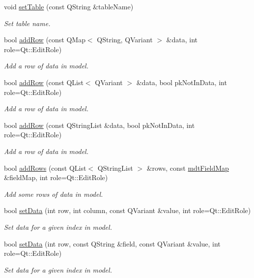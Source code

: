 \begin{DoxyCompactItemize}
\item 
void \hyperlink{classmdt_data_table_model_a75d4204a5d388756605422110d3afca1}{setTable} (const QString \&tableName)
\begin{DoxyCompactList}\small\item\em Set table name. \end{DoxyCompactList}\item 
bool \hyperlink{classmdt_data_table_model_a42046e42fdca91fe77fe48e70fed4d18}{addRow} (const QMap$<$ QString, QVariant $>$ \&data, int role=Qt::EditRole)
\begin{DoxyCompactList}\small\item\em Add a row of data in model. \end{DoxyCompactList}\item 
bool \hyperlink{classmdt_data_table_model_a9c83ac307174ed88eb2204b336d38ee2}{addRow} (const QList$<$ QVariant $>$ \&data, bool pkNotInData, int role=Qt::EditRole)
\begin{DoxyCompactList}\small\item\em Add a row of data in model. \end{DoxyCompactList}\item 
bool \hyperlink{classmdt_data_table_model_a2834bc9663aa478bac5147d2ca7e16ee}{addRow} (const QStringList \&data, bool pkNotInData, int role=Qt::EditRole)
\begin{DoxyCompactList}\small\item\em Add a row of data in model. \end{DoxyCompactList}\item 
bool \hyperlink{classmdt_data_table_model_a359a37d1719c0f56110875888466e331}{addRows} (const QList$<$ QStringList $>$ \&rows, const \hyperlink{classmdt_field_map}{mdtFieldMap} \&fieldMap, int role=Qt::EditRole)
\begin{DoxyCompactList}\small\item\em Add some rows of data in model. \end{DoxyCompactList}\item 
bool \hyperlink{classmdt_data_table_model_a2f502214413e2f12e8df7252ba5f9046}{setData} (int row, int column, const QVariant \&value, int role=Qt::EditRole)
\begin{DoxyCompactList}\small\item\em Set data for a given index in model. \end{DoxyCompactList}\item 
bool \hyperlink{classmdt_data_table_model_ac819eaaee0cb3251658dd0865abdd5f7}{setData} (int row, const QString \&field, const QVariant \&value, int role=Qt::EditRole)
\begin{DoxyCompactList}\small\item\em Set data for a given index in model. \end{DoxyCompactList}\end{DoxyCompactItemize}


